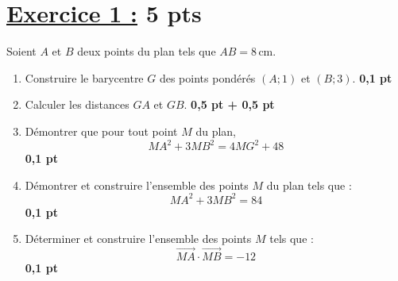 \documentclass[12pt,a4paper]{article}
\begin{document}
\renewcommand{\arraystretch}{1.5}
\renewcommand{\arrayrulewidth}{1.2pt}
\vspace{3cm}

\section*{\underline{Exercice 1 :} 5 pts }

Soient \( A \) et \( B \) deux points du plan tels que \( AB = 8\, \text{cm} \).

\begin{enumerate}
    \item Construire le barycentre \( G \) des points pondérés \( (A; 1) \) et \( (B; 3) \). \hfill \textbf{0{,}1 pt}
    \item Calculer les distances \( GA \) et \( GB \). \hfill \textbf{0{,}5 pt + 0{,}5 pt}
    \item Démontrer que pour tout point \( M \) du plan, 
    \[
    MA^2 + 3MB^2 = 4MG^2 + 48
    \]
    \hfill \textbf{0{,}1 pt}
    \item Démontrer et construire l'ensemble des points \( M \) du plan tels que :
    \[
    MA^2 + 3MB^2 = 84
    \]
    \hfill \textbf{0{,}1 pt}
    \item Déterminer et construire l'ensemble des points \( M \) tels que :
    \[
    \overrightarrow{MA} \cdot \overrightarrow{MB} = -12
    \]
    \hfill \textbf{0{,}1 pt}
\end{enumerate}
\end{document}
